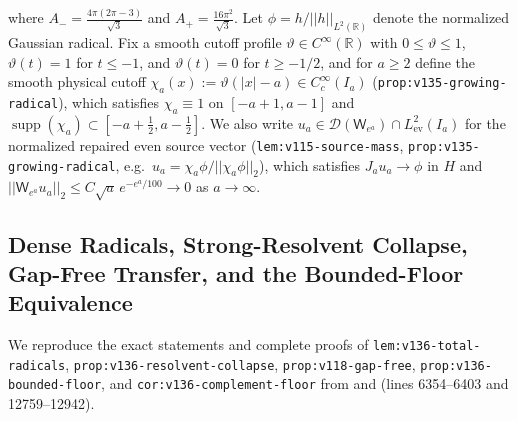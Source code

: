 \documentclass[11pt]{article}
\def\norm#1{||#1||}%
\theoremstyle{remark}
\newcommand{\norm}[1]{\left\lVert #1\right\rVert}
\begin{document}
where $A_- = \frac{4\pi(2\pi-3)}{\sqrt{3}}$ and $A_+ = \frac{16\pi^2}{\sqrt{3}}$. Let $\phi = h/\norm{h}_{L^2(\mathbb{R})}$ denote the normalized Gaussian radical. Fix a smooth cutoff profile $\vartheta \in C^\infty(\mathbb{R})$ with $0 \le \vartheta \le 1$, $\vartheta(t) = 1$ for $t \le -1$, and $\vartheta(t) = 0$ for $t \ge -1/2$, and for $a \ge 2$ define the smooth physical cutoff $\chi_a(x) := \vartheta(|x| - a) \in C_c^\infty(I_a)$ (\texttt{prop:v135-growing-radical}), which satisfies $\chi_a \equiv 1$ on $[-a+1, a-1]$ and $\operatorname{supp}(\chi_a) \subset [-a+\tfrac{1}{2}, a-\tfrac{1}{2}]$. We also write $u_a \in \mathcal{D}(\mathsf{W}_{e^a}) \cap L^2_{\mathrm{ev}}(I_a)$ for the normalized repaired even source vector (\texttt{lem:v115-source-mass}, \texttt{prop:v135-growing-radical}, e.g.\ $u_a = \chi_a\phi/\norm{\chi_a\phi}_2$), which satisfies $J_a u_a \to \phi$ in $H$ and $\norm{\mathsf{W}_{e^a}u_a}_2 \le C\sqrt{a}\,e^{-e^a/100} \to 0$ as $a \to \infty$.

\subsection{Dense Radicals, Strong-Resolvent Collapse, Gap-Free Transfer, and the Bounded-Floor Equivalence}
We reproduce the exact statements and complete proofs of \texttt{lem:v136-total-radicals}, \texttt{prop:v136-resolvent-collapse}, \texttt{prop:v118-gap-free}, \texttt{prop:v136-bounded-floor}, and \texttt{cor:v136-complement-floor} from  and  (lines 6354--6403 and 12759--12942).
\end{document}
